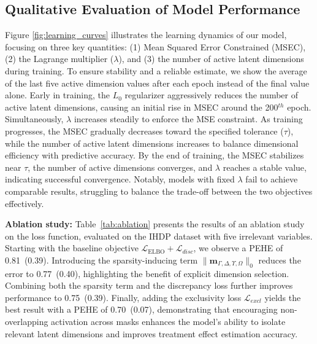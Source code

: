 \documentclass[doubleblind]{ecai}
\begin{document}
	
	
	\subsection{Qualitative Evaluation of Model Performance}
	
	Figure \ref{fig:learning_curves} illustrates the learning dynamics of our model, focusing on three key quantities: (1) Mean Squared Error Constrained (MSEC), (2) the Lagrange multiplier ($\lambda$), and (3) the number of active latent dimensions during training. To ensure stability and a reliable estimate, we show the average of the last five active dimension values after each epoch instead of the final value alone. Early in training, the $L_0$ regularizer aggressively reduces the number of active latent dimensions, causing an initial rise in MSEC around the 200$^{th}$ epoch. Simultaneously, $\lambda$ increases steadily to enforce the MSE constraint. As training progresses, the MSEC gradually decreases toward the specified tolerance ($\tau$), while the number of active latent dimensions increases to balance dimensional efficiency with predictive accuracy. By the end of training, the MSEC stabilizes near $\tau$, the number of active dimensions converges, and $\lambda$ reaches a stable value, indicating successful convergence. Notably, models with fixed $\lambda$ fail to achieve comparable results, struggling to balance the trade-off between the two objectives effectively. 
	

		\textbf{Ablation study:} Table~\ref{tab:ablation} presents the results of an ablation study on the loss function, evaluated on the IHDP dataset with five irrelevant variables. Starting with the baseline objective $\mathcal{L}_{\text{ELBO}} + \mathcal{L}_{disc}$, we observe a PEHE of 0.81~(0.39). Introducing the sparsity-inducing term $\|\mathbf{m}_{\Gamma, \Delta, \Upsilon, \Omega}\|_0$ reduces the error to 0.77~(0.40), highlighting the benefit of explicit dimension selection. Combining both the sparsity term and the discrepancy loss further improves performance to 0.75~(0.39). Finally, adding the exclusivity loss $\mathcal{L}_{\mathit{excl}}$ yields the best result with a PEHE of {0.70~(0.07)}, demonstrating that encouraging non-overlapping activation across masks enhances the model’s ability to isolate relevant latent dimensions and improves treatment effect estimation accuracy.
	
\end{document}
